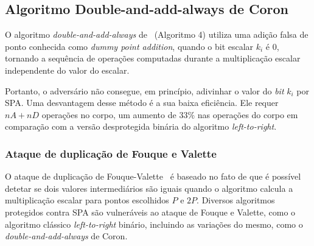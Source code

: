 \documentclass{SBCbookchapter}
\begin{document}

\subsection{Algoritmo Double-and-add-always de Coron~\cite{Coron1999}}

O algoritmo {\it double-and-add-always} de~\cite{Coron1999} (Algoritmo 4) utiliza uma adição falsa de ponto conhecida como \textit{dummy point addition}, quando o bit escalar $k_i$ é $0$, tornando a sequência de operações computadas durante a multiplicação escalar independente do valor do escalar.

Portanto, o adversário não consegue, em princípio, adivinhar o valor do \textit{bit} $k_i$ por SPA. Uma desvantagem desse método é a sua baixa eficiência. Ele requer $nA + nD$ operações no corpo, um aumento de $33\%$ nas operações do corpo em comparação com a versão desprotegida binária do algoritmo \textit{left-to-right}.

\subsubsection{Ataque de duplicação de Fouque e Valette~\cite{CHES:FouVal03}}\label{Fouque-Valette-DoublingAttack}
O ataque de duplicação de Fouque-Valette~\cite{CHES:FouVal03} é baseado no fato de que é possível detetar se dois valores intermediários são iguais quando o algoritmo calcula a multiplicação escalar para pontos escolhidos $P$ e $2P$. Diversos algoritmos protegidos contra SPA são vulneráveis ao ataque de Fouque e Valette, como o algoritmo clássico \textit{left-to-right} binário, incluindo as variações do mesmo, como o \textit{double-and-add-always} de Coron.
\end{document}
